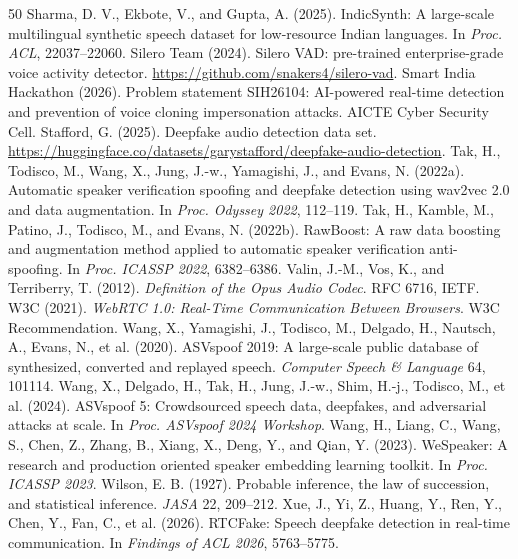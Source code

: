 \documentclass[10pt,a4paper,twocolumn]{article}
\begin{document}
{\begin{thebibliography}{50}
 Sharma, D. V., Ekbote, V., and Gupta, A. (2025). IndicSynth: A large-scale multilingual synthetic speech dataset for low-resource Indian languages. In \emph{Proc. ACL}, 22037--22060.
 Silero Team (2024). Silero VAD: pre-trained enterprise-grade voice activity detector. \url{https://github.com/snakers4/silero-vad}.
 Smart India Hackathon (2026). Problem statement SIH26104: AI-powered real-time detection and prevention of voice cloning impersonation attacks. AICTE Cyber Security Cell.
 Stafford, G. (2025). Deepfake audio detection data set. \url{https://huggingface.co/datasets/garystafford/deepfake-audio-detection}.
 Tak, H., Todisco, M., Wang, X., Jung, J.-w., Yamagishi, J., and Evans, N. (2022a). Automatic speaker verification spoofing and deepfake detection using wav2vec 2.0 and data augmentation. In \emph{Proc. Odyssey 2022}, 112--119.
 Tak, H., Kamble, M., Patino, J., Todisco, M., and Evans, N. (2022b). RawBoost: A raw data boosting and augmentation method applied to automatic speaker verification anti-spoofing. In \emph{Proc. ICASSP 2022}, 6382--6386.
 Valin, J.-M., Vos, K., and Terriberry, T. (2012). \emph{Definition of the Opus Audio Codec}. RFC 6716, IETF.
 W3C (2021). \emph{WebRTC 1.0: Real-Time Communication Between Browsers}. W3C Recommendation.
 Wang, X., Yamagishi, J., Todisco, M., Delgado, H., Nautsch, A., Evans, N., et al. (2020). ASVspoof 2019: A large-scale public database of synthesized, converted and replayed speech. \emph{Computer Speech \& Language} 64, 101114.
 Wang, X., Delgado, H., Tak, H., Jung, J.-w., Shim, H.-j., Todisco, M., et al. (2024). ASVspoof 5: Crowdsourced speech data, deepfakes, and adversarial attacks at scale. In \emph{Proc. ASVspoof 2024 Workshop}.
 Wang, H., Liang, C., Wang, S., Chen, Z., Zhang, B., Xiang, X., Deng, Y., and Qian, Y. (2023). WeSpeaker: A research and production oriented speaker embedding learning toolkit. In \emph{Proc. ICASSP 2023}.
 Wilson, E. B. (1927). Probable inference, the law of succession, and statistical inference. \emph{JASA} 22, 209--212.
 Xue, J., Yi, Z., Huang, Y., Ren, Y., Chen, Y., Fan, C., et al. (2026). RTCFake: Speech deepfake detection in real-time communication. In \emph{Findings of ACL 2026}, 5763--5775.

\end{thebibliography}}
\end{document}
